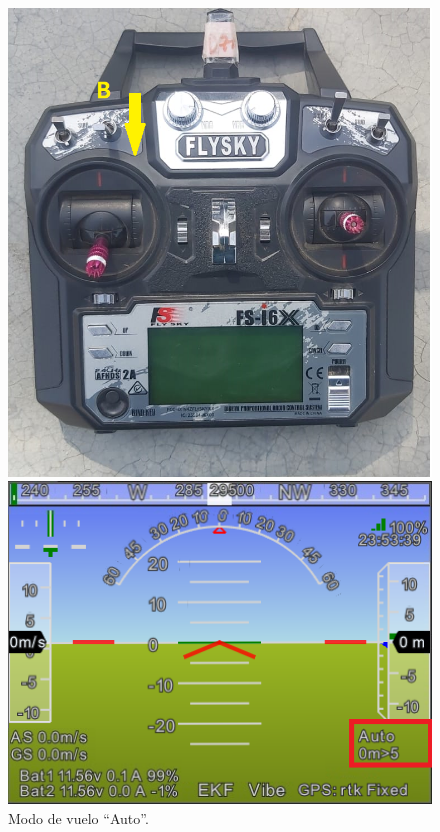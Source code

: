 \begin{figure}[H]
	\centering
	\begin{minipage}[b]{0.4\textwidth}
		\centering
		\includegraphics[width=\textwidth]{imagenes/ctr4}
	\end{minipage}
	\hspace{0.05\textwidth} %
	\begin{minipage}[b]{0.5\textwidth}
		\centering
		\includegraphics[width=1.1\textwidth]{imagenes/mp2}
	\end{minipage}
	\caption{Modo de vuelo “Auto”.}
	\label{fig:modo_stabilize}
\end{figure}


